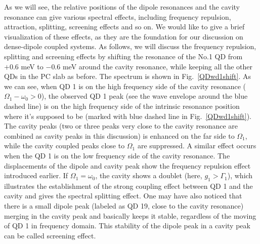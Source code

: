 As we will see, the relative positions of the dipole resonances and the cavity resonance can give various spectral effects, including frequency repulsion, attraction, splitting, screening effects and so on. We would like to give a brief visualization of these effects, as they are the foundation for our discussion on dense-dipole coupled systems. As follows, we will discuss the frequency repulsion, splitting and screening effects by shifting the resonance of the No.1 QD from $+0.6$ meV to $-0.6$ meV around the cavity resonance, while keeping all the other QDs in the PC slab as before. The spectrum is shown in Fig.~\ref{QDwd1shift}.
As we can see, when QD 1 is on the high frequency side of the cavity resonance ($\Omega_1-\omega_0>0$), the observed QD 1 peak (see the wave envelope around the blue dashed line) is on the high frequency side of the intrinsic resonance position where it's supposed to be (marked with blue dashed line in Fig.~\ref{QDwd1shift}). The cavity peaks (two or three peaks very close to the cavity resonance are combined as cavity peaks in this discussion) is enhanced on the far side to $\Omega_1$, while the cavity coupled peaks close to $\Omega_1$ are suppressed. A similar effect occurs when the QD 1 is on the low frequency side of the cavity resonance. The displacements of the dipole and cavity peak show the frequency repulsion effect introduced earlier. If $\Omega_1=\omega_0$, the cavity shows a doublet (here, $g_1>\Gamma_1$), which illustrates the establishment of the strong coupling effect between QD 1 and the cavity and gives the spectral splitting effect. One may have also noticed that there is a small dipole peak (labeled as QD 19, close to the cavity resonance) merging in the cavity peak and basically keeps it stable, regardless of the moving of QD 1 in frequency domain. This stability of the dipole peak in a cavity peak can be called screening effect.

